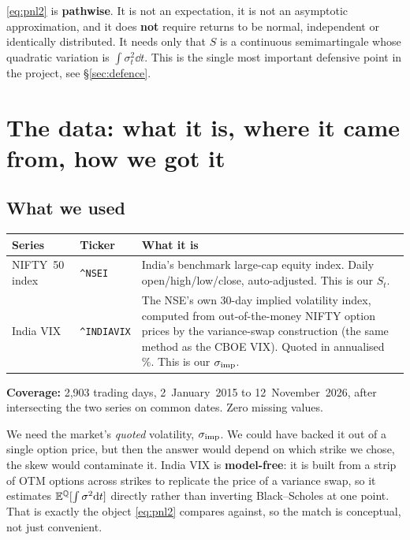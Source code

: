 \documentclass[11pt,a4paper]{article}
\begin{document}
\begin{trapbox}
\eqref{eq:pnl2} is \textbf{pathwise}. It is not an expectation, it is not an
asymptotic approximation, and it does \textbf{not} require returns to be normal, independent
or identically distributed. It needs only that $S$ is a continuous semimartingale whose
quadratic variation is $\int\sigma_t^2\dd t$. This is the single most important defensive point
in the project, see \S\ref{sec:defence}.
\end{trapbox}

\section{The data: what it is, where it came from, how we got it}
\label{sec:data}

\subsection{What we used}

\begin{table}[H]
\centering\small
\begin{tabular}{L{2.9cm}L{3.1cm}L{8.6cm}}
\toprule
\textbf{Series} & \textbf{Ticker} & \textbf{What it is} \\
\midrule
NIFTY~50 index & \texttt{\^{}NSEI} & India's benchmark large-cap equity index. Daily
open/high/low/close, auto-adjusted. This is our $S_t$. \\
India VIX & \texttt{\^{}INDIAVIX} & The NSE's own 30-day implied volatility index, computed
from out-of-the-money NIFTY option prices by the variance-swap construction (the same method
as the CBOE VIX). Quoted in annualised \%. This is our $\sigma_{\mathrm{imp}}$. \\
\bottomrule
\end{tabular}
\end{table}

\textbf{Coverage:} 2{,}903 trading days, 2~January~2015 to 12~November~2026, after intersecting
the two series on common dates. Zero missing values.

\begin{whybox}
We need the market's \emph{quoted} volatility, $\sigma_{\mathrm{imp}}$. We could have backed it out of a single
option price, but then the answer would depend on which strike we chose, the skew would
contaminate it. India VIX is \textbf{model-free}: it is built from a strip of OTM options
across strikes to replicate the price of a variance swap, so it estimates
$\mathbb{E}^{\mathbb{Q}}[\int\sigma^2\mathrm{d} t]$ directly rather than inverting Black--Scholes at one point. That is
exactly the object \eqref{eq:pnl2} compares against, so the match is conceptual, not just
convenient.
\end{whybox}
\end{document}
